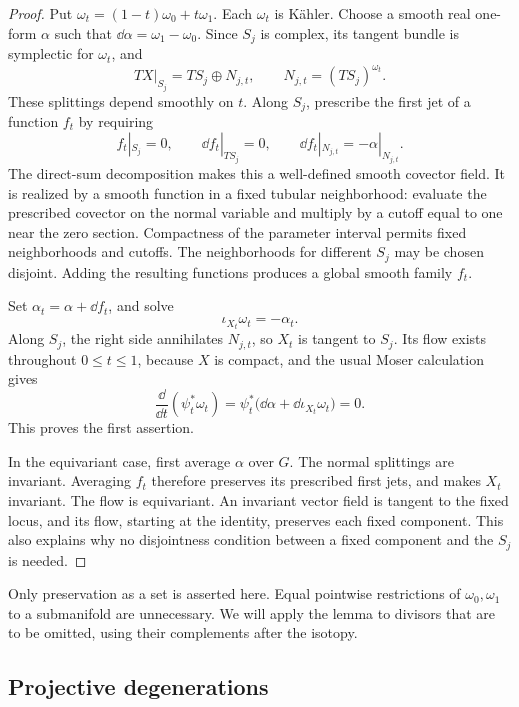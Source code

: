 \begin{proof}
Put \(\omega_t=(1-t)\omega_0+t\omega_1\). Each \(\omega_t\) is
K\"ahler. Choose a smooth real one-form \(\alpha\) such that
\(\dd\alpha=\omega_1-\omega_0\).
Since \(S_j\) is complex, its tangent bundle is symplectic for
\(\omega_t\), and
\[
 TX|_{S_j}=TS_j\oplus N_{j,t},\qquad
 N_{j,t}=(TS_j)^{\omega_t}.
\]
These splittings depend smoothly on \(t\). Along \(S_j\), prescribe
the first jet of a function \(f_t\) by requiring
\[
 f_t|_{S_j}=0,\qquad
 \dd f_t|_{TS_j}=0,\qquad
 \dd f_t|_{N_{j,t}}=-\alpha|_{N_{j,t}}.
\]
The direct-sum decomposition makes this a well-defined smooth
covector field. It is realized by a smooth function in a fixed
tubular neighborhood: evaluate the prescribed covector on the
normal variable and multiply by a cutoff equal to one near the
zero section. Compactness of the parameter interval permits fixed
neighborhoods and cutoffs. The neighborhoods for different \(S_j\)
may be chosen disjoint. Adding the resulting functions produces
a global smooth family \(f_t\).

Set \(\alpha_t=\alpha+\dd f_t\), and solve
\[
 \iota_{X_t}\omega_t=-\alpha_t.
\]
Along \(S_j\), the right side annihilates \(N_{j,t}\), so
\(X_t\) is tangent to \(S_j\).
Its flow exists throughout \(0\le t\le1\), because \(X\) is compact,
and the usual Moser calculation gives
\[
 \frac{\dd}{\dd t}(\psi_t^*\omega_t)
 =\psi_t^*\bigl(\dd\alpha+\dd\iota_{X_t}\omega_t\bigr)=0.
\]
This proves the first assertion.

In the equivariant case, first average \(\alpha\) over \(G\).
The normal splittings are invariant. Averaging \(f_t\) therefore
preserves its prescribed first jets, and makes \(X_t\) invariant.
The flow is equivariant. An invariant vector field is tangent to
the fixed locus, and its flow, starting at the identity, preserves
each fixed component. This also explains why no disjointness
condition between a fixed component and the \(S_j\) is needed.
\end{proof}

Only preservation as a set is asserted here. Equal pointwise
restrictions of \(\omega_0,\omega_1\) to a submanifold are unnecessary.
We will apply the lemma to divisors that are to be omitted, using
their complements after the isotopy.

\subsection{Projective degenerations}

